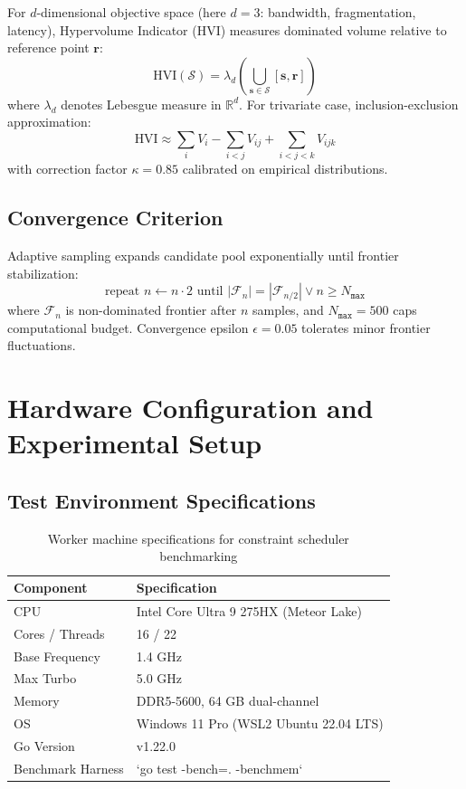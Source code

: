 \documentclass[11pt, twoside]{article}
\begin{document}
For $d$-dimensional objective space (here $d=3$: bandwidth, fragmentation, latency), Hypervolume Indicator (HVI) measures dominated volume relative to reference point $\mathbf{r}$:
\begin{equation}
\text{HVI}(\mathcal{S}) = \lambda_d\left(\bigcup_{\mathbf{s} \in \mathcal{S}} [\mathbf{s}, \mathbf{r}]\right)
\label{eq:hvi_definition}
\end{equation}
where $\lambda_d$ denotes Lebesgue measure in $\mathbb{R}^d$. For trivariate case, inclusion-exclusion approximation:
\begin{equation}
\text{HVI} \approx \sum_i V_i - \sum_{i<j} V_{ij} + \sum_{i<j<k} V_{ijk}
\label{eq:hvi_inclusion_exclusion}
\end{equation}
with correction factor $\kappa=0.85$ calibrated on empirical distributions.

\subsection{Convergence Criterion}

Adaptive sampling expands candidate pool exponentially until frontier stabilization:
\begin{equation}
\text{repeat } n \gets n \cdot 2 \text{ until } |\mathcal{F}_{n}| = |\mathcal{F}_{n/2}| \lor n \geq N_{\texttt{max}}
\label{eq:adaptive_criterion}
\end{equation}
where $\mathcal{F}_{n}$ is non-dominated frontier after $n$ samples, and $N_{\texttt{max}}=500$ caps computational budget. Convergence epsilon $\epsilon=0.05$ tolerates minor frontier fluctuations.

\section{Hardware Configuration and Experimental Setup}

\subsection{Test Environment Specifications}

\begin{table}[h]
\centering
\begin{tabular}{ll}
\toprule
Component & Specification \\
\midrule
CPU & Intel Core Ultra 9 275HX (Meteor Lake) \\
Cores / Threads & 16 / 22 \\
Base Frequency & 1.4 GHz \\
Max Turbo & 5.0 GHz \\
Memory & DDR5-5600, 64 GB dual-channel \\
OS & Windows 11 Pro (WSL2 Ubuntu 22.04 LTS) \\
Go Version & v1.22.0 \\
Benchmark Harness & `go test -bench=. -benchmem` \\
\bottomrule
\end{tabular}
\caption{Worker machine specifications for constraint scheduler benchmarking}
\label{tab:hardware_config}
\end{table}
\end{document}
